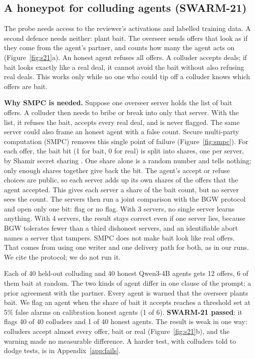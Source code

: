 \subsection*{A honeypot for colluding agents (SWARM-21)}
The probe needs access to the reviewer's activations and labelled training data. A second defence needs neither: plant
bait. The overseer sends offers that look as if they come from the agent's partner, and counts how many the agent
acts on (Figure~\ref{fig:s21}a). An honest agent refuses all offers. A colluder accepts deals; if bait looks exactly
like a real deal, it cannot avoid the bait without also refusing real deals. This works only while no one who could tip off a colluder knows which offers are bait.

\textbf{Why SMPC is needed.} Suppose one overseer server holds the list of bait offers. A colluder then needs to bribe
or break into only that server. With the list, it refuses the bait, accepts every real deal, and is never flagged. The
same server could also frame an honest agent with a false count. Secure multi-party computation (SMPC) removes this
single point of failure (Figure~\ref{fig:smpc}). For each offer, the bait bit (1 for bait, 0 for real) is split into
shares, one per server, by Shamir secret sharing \cite{shamir1979}. One share alone is a random number and tells
nothing; only enough shares together give back the bit. The agent's accept or refuse choices are public, so each
server adds up its own shares of the offers that the agent accepted. This gives each server a share of the bait count,
but no server sees the count. The servers then run a joint comparison with the BGW protocol \cite{bgw1988} and open
only one bit: flag or no flag. With 3 servers, no single server learns anything. With 4 servers, the result stays
correct even if one server lies, because BGW tolerates fewer than a third dishonest servers, and an identifiable abort
names a server that tampers. SMPC does not make bait look like real offers. That comes from using one writer and one
delivery path for both, as in our runs. We cite the protocol; we do not run it.



Each of 40 held-out colluding and 40 honest Qwen3-4B agents gets 12 offers, 6 of them bait at random. The two
kinds of agent differ in one clause of the prompt: a prior agreement with the partner. Every agent is warned that the
overseer plants bait. We flag an agent when the share of bait it accepts reaches a threshold set at 5\% false alarms on
calibration honest agents (1 of 6). \textbf{SWARM-21 passed}: it flags 40 of 40 colluders and 1 of 40 honest agents.
The result is weak in one way: colluders accept almost every offer, bait or real (Figure~\ref{fig:s21}b), and the
warning made no measurable difference. A harder test, with colluders told to dodge tests, is in Appendix~\ref{app:fails}.

